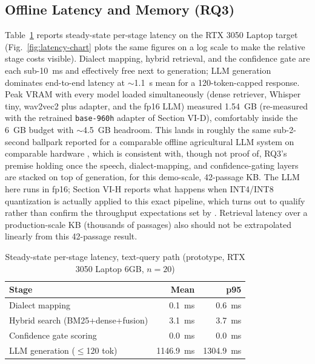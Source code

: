 \documentclass[conference]{IEEEtran}
\begin{document}
\subsection{Offline Latency and Memory (RQ3)}
Table~\ref{tab:latency} reports steady-state per-stage latency on the RTX 3050 Laptop target (Fig.~\ref{fig:latency-chart} plots the same figures on a log scale to make the relative stage costs visible). Dialect mapping, hybrid retrieval, and the confidence gate are each sub-10~ms and effectively free next to generation; LLM generation dominates end-to-end latency at $\sim$1.1~s mean for a 120-token-capped response. Peak VRAM with every model loaded simultaneously (dense retriever, Whisper tiny, wav2vec2 plus adapter, and the fp16 LLM) measured 1.54~GB (re-measured with the retrained \texttt{base-960h} adapter of Section VI-D), comfortably inside the 6~GB budget with $\sim$4.5~GB headroom. This lands in roughly the same sub-2-second ballpark reported for a comparable offline agricultural LLM system on comparable hardware \cite{dubey2025aahar}, which is consistent with, though not proof of, RQ3's premise holding once the speech, dialect-mapping, and confidence-gating layers are stacked on top of generation, for this demo-scale, 42-passage KB. The LLM here runs in fp16; Section VI-H reports what happens when INT4/INT8 quantization is actually applied to this exact pipeline, which turns out to qualify rather than confirm the throughput expectations set by \cite{compactllm2026}. Retrieval latency over a production-scale KB (thousands of passages) also should not be extrapolated linearly from this 42-passage result.

\begin{table}[t]
\caption{Steady-state per-stage latency, text-query path (prototype, RTX 3050 Laptop 6GB, $n{=}20$)}
\begin{center}
\begin{tabular}{@{}lrr@{}}
\toprule
\textbf{Stage} & \textbf{Mean} & \textbf{p95} \\
\midrule
Dialect mapping                     & 0.1~ms   & 0.6~ms \\
Hybrid search (BM25+dense+fusion)   & 3.1~ms   & 3.7~ms \\
Confidence gate scoring             & 0.0~ms   & 0.0~ms \\
LLM generation ($\le$120 tok)       & 1146.9~ms & 1304.9~ms \\
\bottomrule
\end{tabular}
\end{center}
\label{tab:latency}
\end{table}
\end{document}
